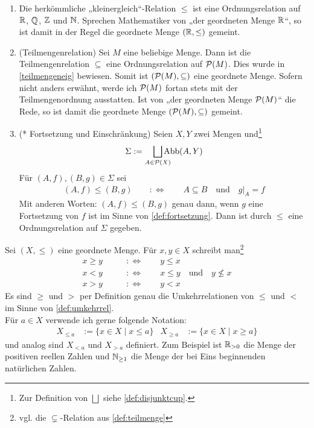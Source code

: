 \begin{bsp} \quad
    \begin{enumerate}
        \item Die herkömmliche „kleinergleich“-Relation $\le$ ist eine Ordnungsrelation auf $\mathbb R$, $\mathbb Q$, $\mathbb Z$ und $\mathbb N$. Sprechen Mathematiker von „der geordneten Menge $\mathbb R$“, so ist damit in der Regel die geordnete Menge $(\mathbb R,\le)$ gemeint.
        \item(Teilmengenrelation) Sei $M$ eine beliebige Menge. Dann ist die Teilmengenrelation $\subseteq$ eine Ordnungsrelation auf $\mathcal P(M)$. Dies wurde in \cref{teilmengeneig} bewiesen. Somit ist $(\mathcal P(M),\subseteq)$ eine geordnete Menge. Sofern nicht anders erwähnt, werde ich $\mathcal P(M)$ fortan stets mit der Teilmengenordnung ausstatten. Ist von „der geordneten Menge $\mathcal P(M)$“ die Rede, so ist damit die geordnete Menge $(\mathcal P(M),\subseteq)$ gemeint.
        \item(* Fortsetzung und Einschränkung) Seien $X,Y$ zwei Mengen und\footnote{Zur Definition von $\bigsqcup$ siehe \cref{def:disjunktcup}.}
            \[ \Sigma := \smashoperator[r]{\bigsqcup_{A\in \calP(X)}} \Abb(A,Y) \]
        Für $(A,f),(B,g)\in\Sigma$ sei
        \begin{align*}
            (A,f) \le (B,g) \qquad:\Leftrightarrow\qquad A\subseteq B\quad \text{und}\quad g\vert_A=f
        \end{align*}
        Mit anderen Worten: $(A,f)\le (B,g)$ genau dann, wenn $g$ eine Fortsetzung von $f$ ist im Sinne von \cref{def:fortsetzung}. Dann ist durch $\le$ eine Ordnungsrelation auf $\Sigma$ gegeben.
    \end{enumerate}
\end{bsp}


\begin{nota} \label{striktkleiner}
    Sei $(X,\le)$ eine geordnete Menge. Für $x,y\in X$ schreibt man\footnote{vgl. die $\subsetneq$-Relation aus \cref{def:teilmenge}}
    \begin{align*}
        x \ge y \qquad &:\Leftrightarrow\qquad y \le x \\
        x < y \qquad &:\Leftrightarrow\qquad x\le y\quad \text{und}\quad y \not \le x \\
        x > y \qquad &:\Leftrightarrow\qquad y < x
    \end{align*}
    Es sind $\ge$ und $>$ per Definition genau die Umkehrrelationen von $\le$ und $<$ im Sinne von \cref{def:umkehrrel}. \\[0.5em]
    Für $a\in X$ verwende ich gerne folgende Notation:
    \begin{align*}
        X_{\le a} & := \{x\in X\mid x\le a\} & X_{\ge a} & := \{x\in X\mid x\ge a\}
    \end{align*}
    und analog sind $X_{<a}$ und $X_{>a}$ definiert. Zum Beispiel ist $\mathbb R_{>0}$ die Menge der positiven reellen Zahlen und $\mathbb N_{\ge 1}$ die Menge der bei Eins beginnenden natürlichen Zahlen.
\end{nota}


